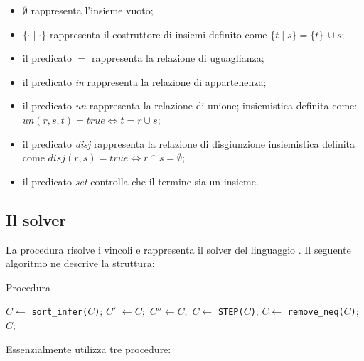 \documentclass[12pt,a4paper,openright]{book} %
\begin{document}
\begin{itemize}
	\item $\emptyset$ rappresenta l’insieme vuoto;
	\item $\{\cdot\mid\cdot\}$ rappresenta il costruttore di
          insiemi definito come $\{t\mid s\} = \{t\}\ \cup s$;
	\item il predicato $=$ rappresenta la relazione di
          uguaglianza;
	\item il predicato \textit{in} rappresenta la relazione di
          appartenenza;
	\item il predicato \textit{un} rappresenta la relazione di
          unione; insiemistica definita come: $un(r,s,t) = true
          \Longleftrightarrow t = r \cup s$;
	\item il predicato \textit{disj} rappresenta la relazione di
          disgiunzione insiemistica definita come $disj(r,s) = true
          \Longleftrightarrow r \cap s = \emptyset$;
	\item il predicato \textit{set} controlla che il termine sia
          un insieme.
\end{itemize}

\subsection{Il solver \satset{}}
\label{subsec:clpbasedlang_lset_solver}

La procedura \satset{} risolve i vincoli e rappresenta il solver del
linguaggio \lset{}. Il seguente algoritmo ne descrive la struttura:

\begin{algorithm}
	\caption{Procedura \satset{}}
	\begin{algorithmic}[1]
		\State $C \gets $ \texttt{sort\_infer($C$)};
		\Repeat
		\State $C'$ $\gets C;$
		\Repeat
		\State $C'' \gets C;$
		\State $C \gets $ \texttt{STEP($C$)};
		\State $C \gets $ \texttt{remove\_neq($C$)};
		\State
		\State\Return $C$;
		\EndProcedure
	\end{algorithmic}
	\label{alg:pseudo_satset}
\end{algorithm}

Essenzialmente  utilizza tre procedure:
\end{document}
